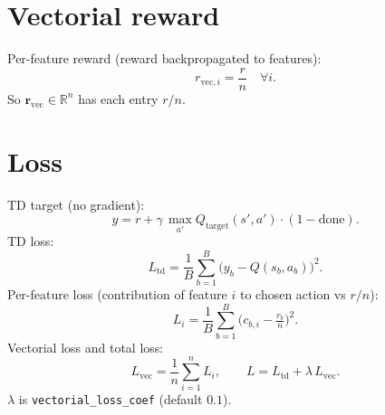 \documentclass[11pt]{article}
\begin{document}
\section{Vectorial reward}
Per-feature reward (reward backpropagated to features):
\begin{equation}
r_{\text{vec},i} = \frac{r}{n} \quad \forall i.
\end{equation}
So $\mathbf{r}_{\text{vec}} \in \mathbb{R}^n$ has each entry $r/n$.

\section{Loss}
TD target (no gradient):
\begin{equation}
y = r + \gamma \, \max_{a'} Q_{\text{target}}(s',a') \cdot (1 - \text{done}).
\end{equation}
TD loss:
\begin{equation}
L_{\text{td}} = \frac{1}{B} \sum_{b=1}^{B} \bigl( y_b - Q(s_b, a_b) \bigr)^2.
\end{equation}
Per-feature loss (contribution of feature $i$ to chosen action vs $r/n$):
\begin{equation}
L_i = \frac{1}{B} \sum_{b=1}^{B} \bigl( c_{b,i} - \tfrac{r_b}{n} \bigr)^2.
\end{equation}
Vectorial loss and total loss:
\begin{equation}
L_{\text{vec}} = \frac{1}{n} \sum_{i=1}^{n} L_i, \qquad
L = L_{\text{td}} + \lambda \, L_{\text{vec}}.
\end{equation}
$\lambda$ is \texttt{vectorial\_loss\_coef} (default $0.1$).
\end{document}

